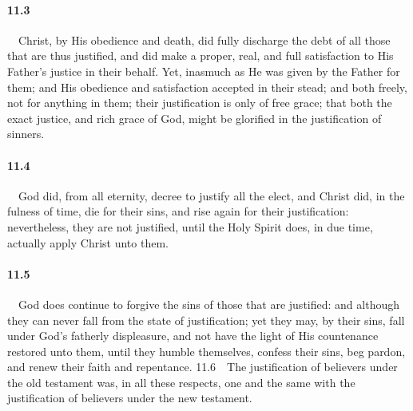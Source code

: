 \paragraph{11.3}\ \ Christ, by His obedience and death, did fully discharge the debt of all those that are thus justified, and did make a proper, real, and full satisfaction to His Father{}'s justice in their behalf. Yet, inasmuch as He was given by the Father for them; and His obedience and satisfaction accepted in their stead; and both freely, not for anything in them; their justification is only of free grace; that both the exact justice, and rich grace of God, might be glorified in the justification of sinners.   
\bigskip
\paragraph{11.4}\ \ God did, from all eternity, decree to justify all the elect, and Christ did, in the fulness of time, die for their sins, and rise again for their justification: nevertheless, they are not justified, until the Holy Spirit does, in due time, actually apply Christ unto them.   
\bigskip
\paragraph{11.5}\ \ God does continue to forgive the sins of those that are justified: and although they can never fall from the state of justification; yet they may, by their sins, fall under God's fatherly displeasure, and not have the light of His countenance restored unto them, until they humble themselves, confess their sins, beg pardon, and renew their faith and repentance.   11.6\ \ The justification of believers under the old testament was, in all these respects, one and the same with the justification of believers under the new testament.  

